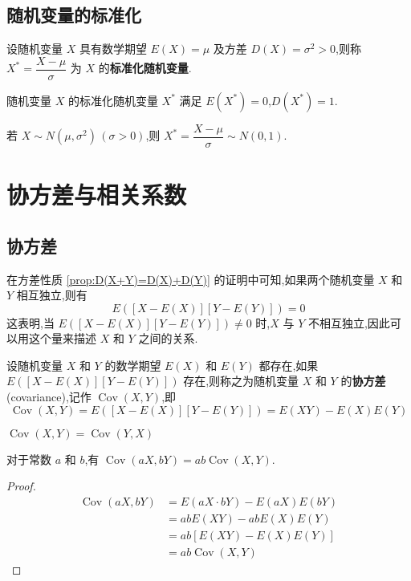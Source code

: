 \subsection{随机变量的标准化}

设随机变量 $X$ 具有数学期望 $E(X)=\mu$ 及方差 $D(X) = \sigma^2 > 0$,则称 $X^* = \dfrac{X-\mu}{\sigma}$ 为 $X$ 的\textbf{标准化随机变量}.

随机变量 $X$ 的标准化随机变量 $X^*$ 满足 $E(X^*)=0$,$D(X^*)=1$.

\vspace{0.5em}

若 $X \sim N(\mu,\sigma^2) \, (\sigma > 0)$,则 $X^* = \dfrac{X-\mu}{\sigma} \sim N(0,1)$.

\section{协方差与相关系数}

\subsection{协方差}

在方差性质 \ref*{prop:D(X+Y)=D(X)+D(Y)} 的证明中可知,如果两个随机变量 $X$ 和 $Y$ 相互独立,则有
$$
E([X-E(X)][Y-E(Y)]) = 0
$$
这表明,当 $E([X-E(X)][Y-E(Y)]) \not= 0$ 时,$X$ 与 $Y$ 不相互独立,因此可以用这个量来描述 $X$ 和 $Y$ 之间的关系.

\begin{definition}
    设随机变量 $X$ 和 $Y$ 的数学期望 $E(X)$ 和 $E(Y)$ 都存在,如果 $E([X-E(X)][Y-E(Y)])$ 存在,则称之为随机变量 $X$ 和 $Y$ 的\textbf{协方差}(covariance),记作 $\operatorname{Cov}(X,Y)$,即
    $$
    \operatorname{Cov}(X,Y) = E([X-E(X)][Y-E(Y)]) = E(XY) - E(X) E(Y)
    $$
\end{definition}

\begin{property}
    $\operatorname{Cov}(X,Y) = \operatorname{Cov}(Y,X)$
\end{property}

\begin{property}
    对于常数 $a$ 和 $b$,有 $\operatorname{Cov}(aX,bY) = ab \operatorname{Cov}(X,Y)$.
\end{property}

\begin{proof}
    $$
    \begin{aligned}
        \operatorname{Cov}(aX,bY) &= E(aX \cdot bY) - E(aX) E(bY) \\
        &= ab E(XY) - ab E(X) E(Y) \\
        &= ab[E(XY) - E(X) E(Y)] \\
        &= ab \operatorname{Cov}(X,Y)
    \end{aligned}
    $$
\end{proof}

